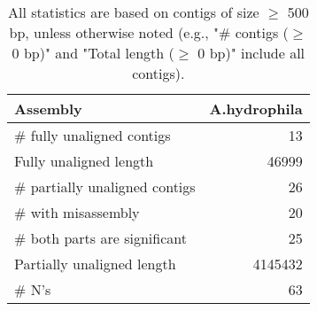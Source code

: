 \documentclass[12pt,a4paper]{article}
\begin{document}
\begin{table}[ht]
\begin{center}
\caption{All statistics are based on contigs of size $\geq$ 500 bp, unless otherwise noted (e.g., "\# contigs ($\geq$ 0 bp)" and "Total length ($\geq$ 0 bp)" include all contigs).}
\begin{tabular}{|l*{1}{|r}|}
\hline
Assembly & A.hydrophila \\ \hline
\# fully unaligned contigs & 13 \\ \hline
Fully unaligned length & 46999 \\ \hline
\# partially unaligned contigs & 26 \\ \hline
\hspace{5mm}\# with misassembly & 20 \\ \hline
\hspace{5mm}\# both parts are significant & 25 \\ \hline
Partially unaligned length & 4145432 \\ \hline
\# N's & 63 \\ \hline
\end{tabular}
\end{center}
\end{table}
\end{document}

